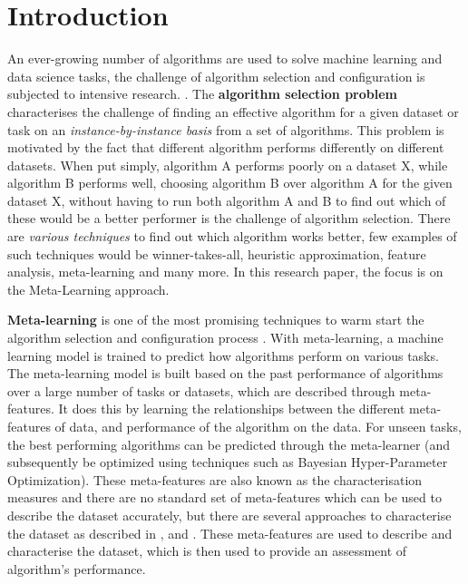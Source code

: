 \chapter{Introduction}
An ever-growing number of algorithms are used to solve machine learning and data science tasks, the challenge of algorithm selection and configuration is subjected to intensive research.  \citep{bischl-et-al,brazdil:p,calandra-et-al,collins-et-al2018,romero-et-al,vartak-et-al}. The \textbf{algorithm selection problem} characterises the challenge of finding an effective algorithm for a given dataset or task on an \textit{instance-by-instance basis} from a set of algorithms. This problem is motivated by the fact that different algorithm performs differently on different datasets. When put simply, algorithm A performs poorly on a dataset X, while algorithm B performs well, choosing algorithm B over algorithm A for the given dataset X, without having to run both algorithm A and B to find out which of these would be a better performer is the challenge of algorithm selection. There are \textit{various techniques} to find out which algorithm works better, few examples of such techniques would be winner-takes-all, heuristic approximation, feature analysis,  meta-learning and many more. In this research paper, the focus is on the Meta-Learning approach.

\textbf{Meta-learning} is one of the most promising techniques to warm start the algorithm selection and configuration process \citep{hutter-et-al}. With meta-learning, a machine learning model is trained to predict how algorithms perform on various tasks. The meta-learning model is built based on the past performance of algorithms over a large number of tasks or datasets, which are described through meta-features. It does this by learning the relationships between the different meta-features of data, and performance of the algorithm on the data. For unseen tasks, the best performing algorithms can be predicted through the meta-learner (and subsequently be optimized using techniques such as Bayesian Hyper-Parameter Optimization). These meta-features are also known as the characterisation measures and there are no standard set of meta-features which can be used to describe the dataset accurately, but there are several approaches to characterise the dataset as described in \citep{feurer:m}, \citep{meta-features-1} and \citep{meta-features-2}. These meta-features are used to describe and characterise the dataset, which is then used to provide an assessment of algorithm's performance.

